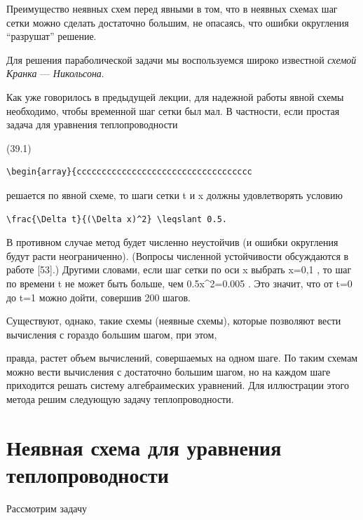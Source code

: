 \documentclass[
  ukrainian,
]{article}
\begin{document}
Преимущество неявных схем перед явными в том, что в неявных схемах шаг
сетки можно сделать достаточно большим, не опасаясь, что ошибки
округления ``разрушат'' решение.

Для решения параболической задачи мы воспользуемся широко известной
\emph{схемой Кранка} --- \emph{Никольсона}.

Как уже говорилось в предыдущей лекции, для надежной работы явной схемы
необходимо, чтобы временной шаг сетки был мал. В частности, если простая
задача для уравнения теплопроводности

(39.1)

\begin{verbatim}
\begin{array}{ccccccccccccccccccccccccccccccccccc
\end{verbatim}

решается по явной схеме, то шаги сетки \Delta t и \Delta x должны
удовлетворять условию

\begin{verbatim}
\frac{\Delta t}{(\Delta x)^2} \leqslant 0.5.
\end{verbatim}

В противном случае метод будет численно неустойчив (и ошибки округления
будут расти неограниченно). (Вопросы численной устойчивости обсуждаются
в работе {[}53{]}.) Другими словами, если шаг сетки по оси x выбрать
\Delta x=0,1 , то шаг по времени \Delta t не может быть больше, чем
0.5\Delta x\^{}2=0.005 . Это значит, что от t=0 до t=1 можно дойти,
совершив 200 шагов.

Существуют, однако, такие схемы (неявные схемы), которые позволяют вести
вычисления с гораздо большим шагом, при этом,

правда, растет объем вычислений, совершаемых на одном шаге. По таким
схемам можно вести вычисления с достаточно большим шагом, но на каждом
шаге приходится решать систему алгебраимеских уравнений. Для иллюстрации
этого метода решим следующую задачу теплопроводности.

\section{Неявная схема для уравнения
теплопроводности}\label{ux43dux435ux44fux432ux43dux430ux44f-ux441ux445ux435ux43cux430-ux434ux43bux44f-ux443ux440ux430ux432ux43dux435ux43dux438ux44f-ux442ux435ux43fux43bux43eux43fux440ux43eux432ux43eux434ux43dux43eux441ux442ux438}

Рассмотрим задачу
\end{document}

